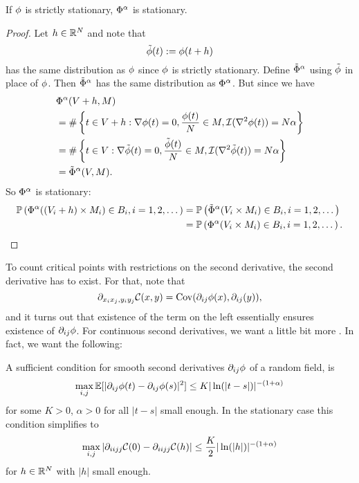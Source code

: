 \begin{lemma}[Stationarity]
	If \(\phi\) is strictly stationary, \(\Phi^\alpha\) is stationary.
\end{lemma}
\begin{proof}
	Let \(h\in \mathbb{R}^N\) and note that
	\[
		\tilde{\phi}(t) := \phi(t+h)
	\]
	has the same distribution as \(\phi\) since \(\phi\) is strictly stationary. Define
	\(\tilde{\Phi}^\alpha\) using \(\tilde{\phi}\) in place of \(\phi\). Then
	\(\tilde{\Phi}^\alpha\) has the same distribution as \(\Phi^\alpha\).
	But since we have
	\begin{align*}
		&\Phi^\alpha(V+h, M)\\
		&= \#\left\{t\in V+h:
			\nabla\phi(t)=0,
			\frac{\phi(t)}{N}\in M,
			\mathcal{I}(\nabla^2 \phi(t))=N\alpha
		\right\}\\
		&= \#\left\{t\in V:
			\nabla\tilde{\phi}(t)=0,
			\frac{\tilde{\phi}(t)}{N}\in M,
			\mathcal{I}(\nabla^2 \tilde{\phi}(t))=N\alpha
		\right\}\\
		&= \tilde{\Phi}^\alpha(V, M).
	\end{align*}
	So \(\Phi^\alpha\) is stationary:
	\begin{align*}
		\mathbb{P}\left(\Phi^\alpha((V_i+h)\times M_i)\in B_i, i=1,2,\dots\right)
		&= \mathbb{P}\left(\tilde{\Phi}^\alpha(V_i\times M_i)\in B_i, i=1,2,\dots\right)\\
		&= \mathbb{P}\left(\Phi^\alpha(V_i\times M_i)\in B_i, i=1,2,\dots\right).
		\qedhere
	\end{align*}
\end{proof}

To count critical points with restrictions on the second derivative, the second
derivative has to exist. For that, note that
\[
	\partial_{x_i x_j, y_i y_j}\mathcal{C}(x,y) = \operatorname{Cov}(\partial_{ij}\phi(x), \partial_{ij}(y)),
\]
and it turns out that existence of the term on the left essentially ensures
existence of \(\partial_{ij}\phi\). For continuous second
derivatives, we want a little bit more \parencite[cf.
Theorem~1.4.1]{adlerRandomFieldsGeometry2007}. In fact, we want the following:

\begin{assumption}\label{assmpt: smoothness assumption}
	A sufficient condition for smooth second derivatives \(\partial_{ij}	\phi\)
	of a random field, is
	\begin{equation}\label{eq: sufficient for continuous second derivative}
		\max_{i,j}\mathbb{E}[|\partial_{ij}\phi(t) - \partial_{ij}\phi(s)|^2]
		\le K |\ln(|t-s|)|^{-(1+\alpha)}
	\end{equation}
	for some \(K>0\), \(\alpha>0\) for all \(|t-s|\) small enough.
	In the stationary case this condition simplifies to
	\[
		\max_{i,j}|\partial_{ii jj}\mathcal{C}(0)
		-\partial_{ii jj}\mathcal{C}(h)| \le \frac{K}2 |\ln(|h|)|^{-(1+\alpha)}
	\]
	for \(h\in\mathbb{R}^N\) with \(|h|\) small enough.
\end{assumption}


